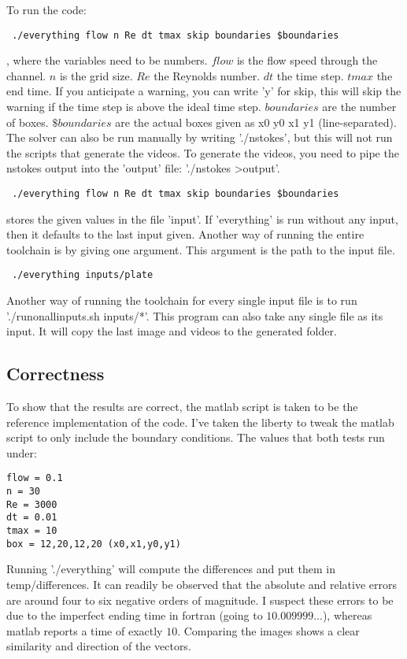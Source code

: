 \documentclass[listof=totoc]{report}
\begin{document}
To run the code:
\begin{verbatim} ./everything flow n Re dt tmax skip boundaries $boundaries \end{verbatim}, where the variables need to be numbers. $flow$ is the flow speed through the channel. $n$ is the grid size. $Re$ the Reynolds number. $dt$ the time step. $tmax$ the end time. If you anticipate a warning, you can write 'y' for skip, this will skip the warning if the time step is above the ideal time step. $boundaries$ are the number of boxes. $\$boundaries$ are the actual boxes given as x0 y0 x1 y1 (line-separated). The solver can also be run manually by writing './nstokes', but this will not run the scripts that generate the videos. To generate the videos, you need to pipe the nstokes output into the 'output' file: './nstokes \textgreater output'.
\begin{verbatim} ./everything flow n Re dt tmax skip boundaries $boundaries \end{verbatim} stores the given values in the file 'input'. If 'everything' is run without any input, then it defaults to the last input given.
Another way of running the entire toolchain is by giving one argument. This argument is the path to the input file. \begin{verbatim} ./everything inputs/plate \end{verbatim}
Another way of running the toolchain for every single input file is to run './run\textunderscore on\textunderscore all\textunderscore inputs.sh inputs/*'. This program can also take any single file as its input. It will copy the last image and videos to the generated folder.

\subsection{Correctness}
To show that the results are correct, the matlab script is taken to be the reference implementation of the code. I've taken the liberty to tweak the matlab script to only include the boundary conditions. The values that both tests run under:

\begin{verbatim}
flow = 0.1
n = 30
Re = 3000
dt = 0.01
tmax = 10
box = 12,20,12,20 (x0,x1,y0,y1)
\end{verbatim}

Running './everything' will compute the differences and put them in temp/differences. It can readily be observed that the absolute and relative errors are around four to six negative orders of magnitude. I suspect these errors to be due to the imperfect ending time in fortran (going to $10.009999$...), whereas matlab reports a time of exactly $10$. Comparing the images shows a clear similarity and direction of the vectors.
\end{document}
